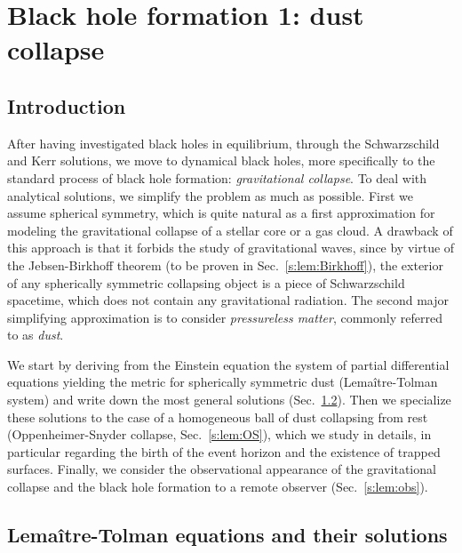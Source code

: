 \chapter{Black hole formation 1: dust collapse}
\label{s:lem}

\minitoc

\section{Introduction}

After having investigated black holes in equilibrium, through the
Schwarzschild and Kerr solutions, we move to dynamical black holes,
more specifically to the standard process of
black hole formation: \emph{gravitational collapse}.
To deal with analytical solutions, we simplify the problem as much as
possible. First we assume spherical symmetry, which is quite natural
as a first approximation for modeling the gravitational collapse
of a stellar core or a gas cloud. A drawback of this approach is that it forbids the
study of gravitational waves, since by
virtue of the Jebsen-Birkhoff theorem
(to be proven in Sec.~\ref{s:lem:Birkhoff}),
the exterior
of any spherically symmetric collapsing object is a piece of Schwarzschild
spacetime, which does not contain any gravitational radiation.
The second major simplifying approximation is to consider \emph{pressureless matter},
commonly referred to as \emph{dust}.

We start by deriving from the Einstein equation the system of partial differential
equations yielding the metric for spherically symmetric dust (Lemaître-Tolman
system) and write down the most general solutions (Sec.~\ref{s:lem:LT_equat}).
Then we specialize these solutions to the case of a homogeneous ball of dust
collapsing from rest (Oppenheimer-Snyder collapse, Sec.~\ref{s:lem:OS}),
which we study in details, in particular regarding the birth of the event
horizon and the existence of trapped surfaces. Finally, we consider
the observational appearance of the gravitational collapse and the black hole
formation to a remote observer (Sec.~\ref{s:lem:obs}).


\section{Lemaître-Tolman equations and their solutions} \label{s:lem:LT_equat}

